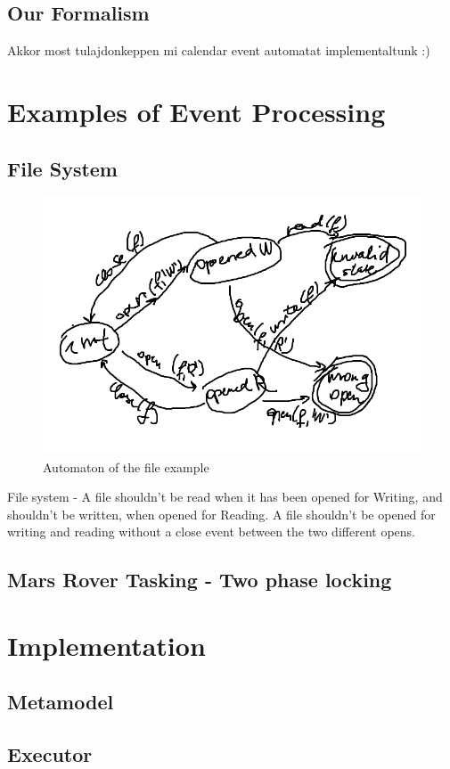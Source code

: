 	\subsection{Our Formalism}
		Akkor most tulajdonkeppen mi calendar event automatat implementaltunk :) 
\section{Examples of Event Processing}

	\subsection{File System}
	
	\begin{figure}[h]
	\centering
	\includegraphics[width=0.5\linewidth]{include/figures/chapter_5/fileautomaton}
	\caption{Automaton of the file example}
	\label{fig:cep:fileautomaton}
	\end{figure}

	File system - A file shouldn't be read when it has been opened for Writing, and shouldn't be written, when opened for Reading. 
	A file shouldn't be opened for writing and reading without a close event between the two different opens.
	
	
	\subsection{Mars Rover Tasking - Two phase locking}

\section{Implementation}
	\subsection{Metamodel}
	\subsection{Executor}